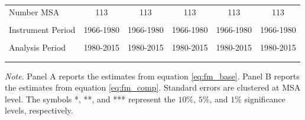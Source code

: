 \documentclass[dv_diss_main.tex]{subfiles}
\begin{document}
\begin{table}[H]
\begin{center}
{\begin{tabular}{lccccc}
    Number MSA & 113 & 113 & 113 & 113 & 113 \\
    \vspace{-2pt} & \vspace{-2pt} & \vspace{-2pt} & \vspace{-2pt} & \vspace{-2pt} \\
    Instrument Period & 1966-1980 & 1966-1980 & 1966-1980 & 1966-1980 & 1966-1980 \\
    \vspace{-2pt} & \vspace{-2pt} & \vspace{-2pt} & \vspace{-2pt} & \vspace{-2pt} \\
    Analysis Period & 1980-2015 & 1980-2015 & 1980-2015 & 1980-2015 & 1980-2015 \\ 
    \vspace{-2pt} & \vspace{-2pt} & \vspace{-2pt} & \vspace{-2pt} & \vspace{-2pt} \\ \hline
    
    \vspace{-2pt} & \vspace{-2pt} & \vspace{-2pt} & \vspace{-2pt} \\
    
    
    \end{tabular}
    }
    \label{tab:fm_restricted}
    \end{center}
       
    \footnotesize{\textit{Note. }Panel A reports the estimates from equation \eqref{eq:fm_base}. Panel B reports the estimates from equation \eqref{eq:fm_comp}. Standard errors are clustered at MSA level. The symbols *, **, and *** represent the $10\%$, $5\%$, and $1\%$ significance levels, respectively.}
\end{table}

\end{document}
